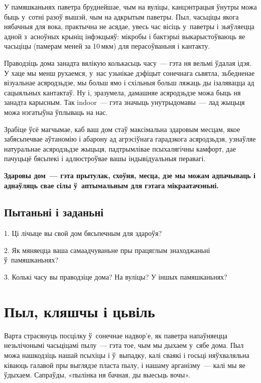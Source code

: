 У памяшканьнях паветра бруднейшае, чым на вуліцы, канцэнтрацыя ўнутры можа быць у~сотні разоў вышэй, чым на адкрытым паветры. Пыл, часьціцы якога нябачныя для вока, практычна не асядае, увесь час вісіць у~паветры і зьяўляецца адной з~асноўных крыніц інфэкцыяў: мікробы і бактэрыі выкарыстоўваюць яе часьціцы (памерам меней за 10\,мкм) для перасоўваньня і кантакту.


Праводзіць дома занадта вялікую колькасьць часу~--- гэта ня вельмі ўдалая ідэя. У хаце мы менш рухаемся, у~нас узьнікае дэфіцыт сонечнага сьвятла, зьбедненае візуальнае асяродзьдзе, мы больш ямо і схільныя больш ляжаць ды ізалявацца ад сацыяльных кантактаў. Ну і, зразумела, дамашняе асяродзьдзе можа быць ня занадта карысным. Так indoor~--- гэта значыць унутрыдомавы~--- лад жыцьця можа нэгатыўна ўплываць на нас.

Зрабіце ўсё магчымае, каб ваш дом стаў максімальна здаровым месцам, якое забясьпечвае аўтаномію і абарону ад агрэсіўнага гарадзкога асяродзьдзя, узнаўляе натуральнае асяродзьдзе жыцьця, падтрымлівае псыхалягічны камфорт, дае пачуцьцё бясьпекі і адлюстроўвае вашы індывідуальныя перавагі.

\textbf{Здаровы дом~--- гэта прытулак, схоўня, месца, дзе мы можам адпачываць і аднаўляць свае сілы ў~аптымальным для гэтага мікраатачэньні.}

\subsection*{Пытаньні і заданьні}

1. Ці лічыце вы свой дом бясьпечным для здароўя?

2. Як мяняецца ваша самаадчуваньне пры працяглым знаходжаньні ў~памяшканьнях?

3. Колькі часу вы праводзіце дома? На вуліцы? У іншых памяшканьнях?


\section{Пыл, кляшчы і цьвіль}

Варта страсянуць посцілку ў~сонечнае надвор'е, як паветра напаўняецца незьлічонымі часьціцамі пылу~--- гэта тое, чым мы дыхаем у~сябе дома. Пыл можа нашкодзіць нашай псыхіцы і ў~выпадку, калі сваякі і госьці няўхваляльна ківаюць галавой пры выглядзе пласта пылу, і нашаму арганізму~--- калі мы яе ўдыхаем. Сапраўды, «пылінка ня бачная, ды выесьць вочы». 

